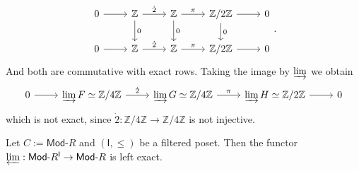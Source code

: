 \begin{rem}
	\begin{equation}
	\begin{tikzcd}
		0 \arrow[r, "", rightarrow] &
		\Z \arrow[r, "\dot{2}", rightarrow] \arrow[d, "0", rightarrow] &
		\Z \arrow[r, "\pi", rightarrow] \arrow[d, "0", rightarrow] &
		\mathbb{Z}/2\mathbb{Z} \arrow[r, "", rightarrow] \arrow[d, "0", rightarrow] &
		0 \\
		0 \arrow[r, "", rightarrow] &
		\Z \arrow[r, "\dot{2}", rightarrow]&
		\Z \arrow[r, "\pi", rightarrow] &
		\mathbb{Z}/2\mathbb{Z} \arrow[r, "", rightarrow] &
		0
	\end{tikzcd}
	.\end{equation}
	And both are commutative with exact rows.
	Taking the image by $\varinjlim$ we obtain
	\begin{equation}
	\begin{tikzcd}
		0 \arrow[r, "", rightarrow] &
		\varinjlim F \simeq \mathbb{Z}/4\mathbb{Z} \arrow[r, "\dot{2}", rightarrow] &
		\varinjlim G \simeq \mathbb{Z}/4\mathbb{Z} \arrow[r, "\pi", rightarrow] &
		\varinjlim H \simeq \mathbb{Z}/2\mathbb{Z} \arrow[r, "", rightarrow] &
		0
	\end{tikzcd}
	\end{equation} 
	which is not exact, since $\dot{2}: \mathbb{Z}/4\mathbb{Z} \to \mathbb{Z}/4\mathbb{Z}$ is not injective.
\end{rem}

\begin{prop}
	Let $C := \mathsf{Mod}\text{-}R$ and $\left(\mathsf{I}, \leq\right)$ be a filtered poset.
	Then the functor $\varprojlim: \mathsf{Mod}\text{-}R^{\mathsf{I}} \to \mathsf{Mod}\text{-}R$ is left exact.
\end{prop} 

